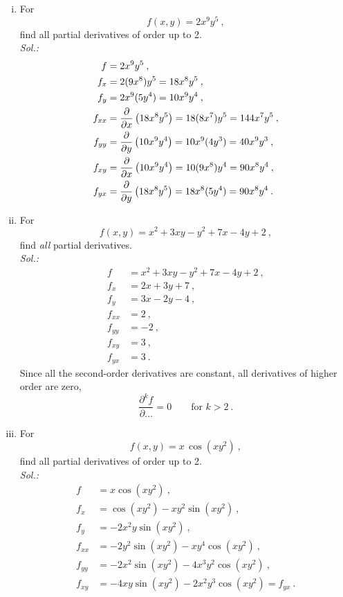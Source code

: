 \begin{example}
\begin{enumerate}[(i)]
	\item
	For \[ f(x,y) = 2x^9y^5 \:, \] find all partial derivatives of order up to 2.\\
	{\it Sol.:}
	\begin{equation*}
	\begin{split}
	f & = 2x^9y^5 \:, \\
	f_x & = 2(9x^8)y^5=18x^8y^5 \:, \\
	f_y & = 2x^9(5y^4)=10x^9y^4 \:, \\
	f_{xx} & = \displaystyle{\frac{\partial }{\partial x}} \left( 18x^8y^5 \right)=18(8x^7)y^5=144x^7y^5 \:, \\
	f_{yy} & = \displaystyle{\frac{\partial }{\partial y}} \left( 10x^9y^4 \right)=10x^9(4y^3)=40x^9y^3 \:, \\
	f_{xy} & = \displaystyle{\frac{\partial }{\partial x}} \left( 10x^9y^4 \right)=10(9x^8)y^4=90x^8y^4 \:, \\
	f_{yx} & = \displaystyle{\frac{\partial }{\partial y}} \left( 18x^8y^5 \right)=18x^8(5y^4)=90x^8y^4 \:.
	\end{split}
	\end{equation*}
	\item
For \[f(x,y) = x^2 + 3xy - y^2 + 7x -4 y +2 \:, \] find \emph{all} partial derivatives.\\
{\it Sol.:}
\begin{equation*}
\begin{split}
f & = x^2+3xy-y^2+7x-4y+2 \:, \\
f_x & =  2x+3y+7 \:, \\
f_y & =  3x-2y-4 \:, \\
f_{xx} & = 2 \:, \\
f_{yy} & = -2 \:, \\
f_{xy} & = 3 \:, \\
f_{yx} & = 3 \:.
\end{split}
\end{equation*}
Since all the second-order derivatives are constant, all derivatives of higher order are zero,
\[ \frac{\partial^k f}{\partial \dots} = 0 \qquad \text{for~}k>2 \:. \]
	\item
	For \[ f(x,y) = x\, \cos(xy^2) \:, \] find all partial derivatives of order up to 2.\\
	{\it Sol.:}
	\begin{equation*}
	\begin{split}
	f & = x \cos(xy^2) \:, \\
	f_x & = \cos(xy^2) - xy^2 \sin(xy^2) \:, \\
	f_y & = -2x^2y \sin(xy^2) \:, \\
	f_{xx} & = -2y^2 \sin(xy^2) - xy^4 \cos(xy^2) \:, \\
	f_{yy} & = -2x^2 \sin(xy^2) - 4x^3y^2 \cos(xy^2) \:, \\
	f_{xy} & = -4xy \sin(xy^2) - 2x^2y^3 \cos(xy^2) = f_{yx} \:.
	\end{split}
	\end{equation*}
\end{enumerate}
\end{example}

